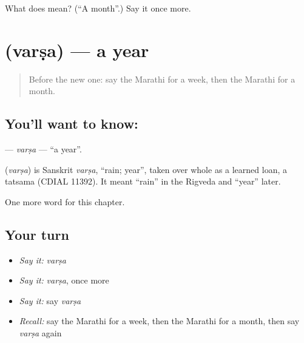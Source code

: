 \begin{tcolorbox}[breakable,colback=teal!4,colframe=teal!35!black,title={Before you move on}]
What does  mean? (\textquotedblleft{}A month\textquotedblright{}.) Say it once more.
\end{tcolorbox}
\section[\texorpdfstring{\mr{वर्ष} (varṣa)}{वर्ष (varṣa)}]{ (varṣa) — a year}

\label{lesson:MR-C109-varsa}



\begin{quote}
Before the new one: say the Marathi for a week, then the Marathi for a month.
\end{quote}

\subsection*{You'll want to know: }
\textbf{} — \emph{varṣa} — \textquotedblleft{}a year\textquotedblright{}.

\begin{cousinweb}
\textbf{} (\emph{varṣa}) is Sanskrit \emph{varṣa}, \textquotedblleft{}rain; year\textquotedblright{}, taken over whole as a learned loan, a tatsama (CDIAL 11392). It meant \textquotedblleft{}rain\textquotedblright{} in the Rigveda and \textquotedblleft{}year\textquotedblright{} later.
\end{cousinweb}

\begin{grammarlens}[title={What you've built}]
One more word for this chapter.
\end{grammarlens}

\subsection*{Your turn}
\begin{itemize}
\raggedright
  \item \emph{Say it:} \emph{varṣa}
  \item \emph{Say it:} \emph{varṣa}, once more
  \item \emph{Say it:} say \emph{varṣa}
  \item \emph{Recall:} say the Marathi for a week, then the Marathi for a month, then say \emph{varṣa} again
\end{itemize}

